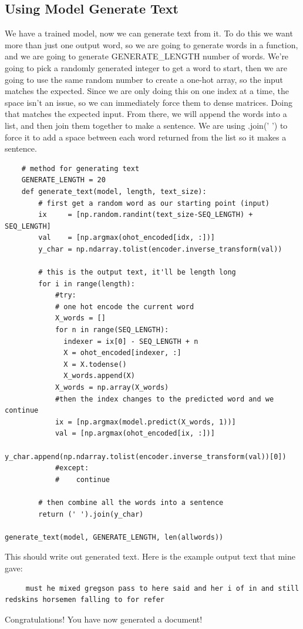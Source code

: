 \documentclass{article}
\begin{document}
  
  \subsection{Using Model Generate Text}
 We have a trained model, now we can generate text from it. To do this we want more than just one output word, so we are going to generate words in a function, and we are going to generate GENERATE\_LENGTH number of words. We're going to pick a randomly generated integer to get a word to start, then we are going to use the same random number to create a one-hot array, so the input matches the expected. Since we are only doing this on one index at a time, the space isn't an issue, so we can immediately force them to dense matrices. Doing that matches the expected input. From there, we will append the words into a list, and then join them together to make a sentence.  We are using .join(' ') to force it to add a space between each word returned from the list so it makes a sentence.
 
 
 \begin{verbatim}
    # method for generating text
    GENERATE_LENGTH = 20
    def generate_text(model, length, text_size):
        # first get a random word as our starting point (input)
        ix     = [np.random.randint(text_size-SEQ_LENGTH) + SEQ_LENGTH]
        val    = [np.argmax(ohot_encoded[idx, :])]
        y_char = np.ndarray.tolist(encoder.inverse_transform(val))
    
        # this is the output text, it'll be length long
        for i in range(length):
            #try:
            # one hot encode the current word
            X_words = []
            for n in range(SEQ_LENGTH):
              indexer = ix[0] - SEQ_LENGTH + n
              X = ohot_encoded[indexer, :]
              X = X.todense()
              X_words.append(X)
            X_words = np.array(X_words)
            #then the index changes to the predicted word and we continue
            ix = [np.argmax(model.predict(X_words, 1))]
            val = [np.argmax(ohot_encoded[ix, :])]
            y_char.append(np.ndarray.tolist(encoder.inverse_transform(val))[0])
            #except:
            #    continue
    
        # then combine all the words into a sentence        
        return (' ').join(y_char)

generate_text(model, GENERATE_LENGTH, len(allwords))
 \end{verbatim}
 
 This should write out generated text. Here is the example output text that mine gave:
 
 \begin{verbatim}
     must he mixed gregson pass to here said and her i of in and still redskins horsemen falling to for refer
 \end{verbatim}
 
 Congratulations! You have now generated a document!
 
\end{document}
